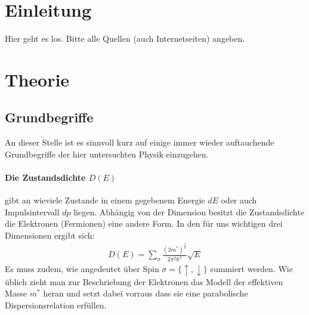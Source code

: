 \documentclass[twoside,        %
               BCOR12mm,       %
               english,ngerman, %
               fleqn,headsepline=false,footsepline=false
              ]{MFPREPORT}
\begin{document}
\date{\today}
\CopyNotWanted

\maketitle


\tableofcontents

\clearpage
{}

\section{Einleitung}
Hier geht es los. Bitte alle Quellen (auch Internetseiten) angeben.


\section{Theorie}

\subsection{Grundbegriffe}
An dieser Stelle ist es sinnvoll kurz auf
einige immer wieder auftauchende Grundbegriffe der hier untersuchten Physik einzugehen.








\paragraph{Die Zustandsdichte $D(E)$} gibt an wieviele Zustande in einem gegebenem Energie $dE$ oder auch Impulsintervall $d p$ liegen.
Abhängig von der Dimension besitzt die Zustandsdichte die Elektronen (Fermionen) eine andere Form. 
In den für uns wichtigen drei Dimensionen ergibt sich:
\begin{align}
D(E) = \sum_{\sigma} \frac{(2m^{*})^{\frac{3}{2}}}{2 \pi^2 \hbar^3} \sqrt{E}
\end{align}
Es muss zudem, wie angedeutet über Spin $\sigma=\lbrace \uparrow, \downarrow \rbrace$ summiert werden.
Wie üblich zieht man zur Beschriebung der Elektronen das Modell der effektiven Masse $m^{*}$ heran und setzt dabei vorraus dass sie eine parabolische Dispersionsrelation erfüllen.
\\
\end{document}
